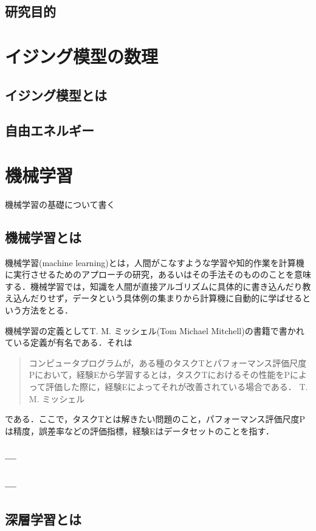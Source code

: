 \documentclass[a4paper,11pt]{jsreport}
\begin{document}
\section{研究目的}


\chapter{イジング模型の数理}
\section{イジング模型とは}
\section{自由エネルギー}

\chapter{機械学習}
機械学習の基礎について書く
\section{機械学習とは}
機械学習(machine learning)とは，人間がこなすような学習や知的作業を計算機に実行させるためのアプローチの研究，あるいはその手法そのもののことを意味する．機械学習では，知識を人間が直接アルゴリズムに具体的に書き込んだり教え込んだりせず，データという具体例の集まりから計算機に自動的に学ばせるという方法をとる．\par
機械学習の定義としてT. M. ミッシェル(Tom Michael Mitchell)の書籍で書かれている定義が有名である．それは
\begin{quote}
  コンピュータプログラムが，ある種のタスクTとパフォーマンス評価尺度Pにおいて，経験Eから学習するとは，タスクTにおけるその性能をPによって評価した際に，経験Eによってそれが改善されている場合である．
  \hfill T. M. ミッシェル
\end{quote}
である．ここで，タスクTとは解きたい問題のこと，パフォーマンス評価尺度Pは精度，誤差率などの評価指標，経験Eはデータセットのことを指す．


\subsection{---}
\subsection{---}
\section{深層学習とは}
\end{document}
